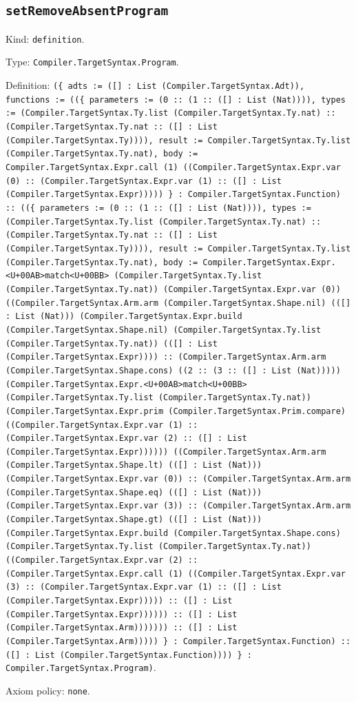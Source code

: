 \documentclass[11pt]{article}
\begin{document}
\subsection*{\texttt{setRemoveAbsentProgram}}
\noindent Kind: \texttt{definition}.\par
\noindent Type: \texttt{Compiler.TargetSyntax.Program}.\par
\noindent Definition: \texttt{(\{ adts := ([] : List (Compiler.TargetSyntax.Adt)), functions := ((\{ parameters := (0 :: (1 :: ([] : List (Nat)))), types := (Compiler.TargetSyntax.Ty.list (Compiler.TargetSyntax.Ty.nat) :: (Compiler.TargetSyntax.Ty.nat :: ([] : List (Compiler.TargetSyntax.Ty)))), result := Compiler.TargetSyntax.Ty.list (Compiler.TargetSyntax.Ty.nat), body := Compiler.TargetSyntax.Expr.call (1) ((Compiler.TargetSyntax.Expr.var (0) :: (Compiler.TargetSyntax.Expr.var (1) :: ([] : List (Compiler.TargetSyntax.Expr))))) \} : Compiler.TargetSyntax.Function) :: ((\{ parameters := (0 :: (1 :: ([] : List (Nat)))), types := (Compiler.TargetSyntax.Ty.list (Compiler.TargetSyntax.Ty.nat) :: (Compiler.TargetSyntax.Ty.nat :: ([] : List (Compiler.TargetSyntax.Ty)))), result := Compiler.TargetSyntax.Ty.list (Compiler.TargetSyntax.Ty.nat), body := Compiler.TargetSyntax.Expr.<U+00AB>match<U+00BB> (Compiler.TargetSyntax.Ty.list (Compiler.TargetSyntax.Ty.nat)) (Compiler.TargetSyntax.Expr.var (0)) ((Compiler.TargetSyntax.Arm.arm (Compiler.TargetSyntax.Shape.nil) (([] : List (Nat))) (Compiler.TargetSyntax.Expr.build (Compiler.TargetSyntax.Shape.nil) (Compiler.TargetSyntax.Ty.list (Compiler.TargetSyntax.Ty.nat)) (([] : List (Compiler.TargetSyntax.Expr)))) :: (Compiler.TargetSyntax.Arm.arm (Compiler.TargetSyntax.Shape.cons) ((2 :: (3 :: ([] : List (Nat))))) (Compiler.TargetSyntax.Expr.<U+00AB>match<U+00BB> (Compiler.TargetSyntax.Ty.list (Compiler.TargetSyntax.Ty.nat)) (Compiler.TargetSyntax.Expr.prim (Compiler.TargetSyntax.Prim.compare) ((Compiler.TargetSyntax.Expr.var (1) :: (Compiler.TargetSyntax.Expr.var (2) :: ([] : List (Compiler.TargetSyntax.Expr)))))) ((Compiler.TargetSyntax.Arm.arm (Compiler.TargetSyntax.Shape.lt) (([] : List (Nat))) (Compiler.TargetSyntax.Expr.var (0)) :: (Compiler.TargetSyntax.Arm.arm (Compiler.TargetSyntax.Shape.eq) (([] : List (Nat))) (Compiler.TargetSyntax.Expr.var (3)) :: (Compiler.TargetSyntax.Arm.arm (Compiler.TargetSyntax.Shape.gt) (([] : List (Nat))) (Compiler.TargetSyntax.Expr.build (Compiler.TargetSyntax.Shape.cons) (Compiler.TargetSyntax.Ty.list (Compiler.TargetSyntax.Ty.nat)) ((Compiler.TargetSyntax.Expr.var (2) :: (Compiler.TargetSyntax.Expr.call (1) ((Compiler.TargetSyntax.Expr.var (3) :: (Compiler.TargetSyntax.Expr.var (1) :: ([] : List (Compiler.TargetSyntax.Expr))))) :: ([] : List (Compiler.TargetSyntax.Expr)))))) :: ([] : List (Compiler.TargetSyntax.Arm))))))) :: ([] : List (Compiler.TargetSyntax.Arm))))) \} : Compiler.TargetSyntax.Function) :: ([] : List (Compiler.TargetSyntax.Function)))) \} : Compiler.TargetSyntax.Program)}.\par
\noindent Axiom policy: \texttt{none}.\par
\end{document}
